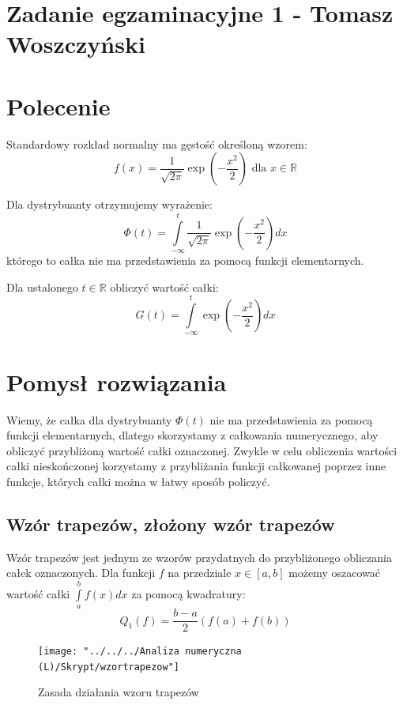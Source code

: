 \documentclass[a4paper,12pt]{article}
\begin{document}
\section*{Zadanie egzaminacyjne 1 - Tomasz Woszczyński}

\section{Polecenie}
Standardowy rozkład normalny ma gęstość określoną wzorem:
\[
    f(x) = \frac{1}{\sqrt{2\pi}} \exp \left( - \frac{x^2}{2} \right)
    \text{ dla } x \in \mathbb{R}
\]

\noindent Dla dystrybuanty otrzymujemy wyrażenie:
\[
    \Phi(t) = \int\limits_{-\infty}^{t} \frac{1}{\sqrt{2\pi}} 
                \exp \left( - \frac{x^2}{2} \right) dx
\]
którego to całka nie ma przedstawienia za pomocą funkcji elementarnych. 

\noindent Dla ustalonego $t \in \mathbb{R}$ obliczyć wartość całki:
\[
    G(t) = \int\limits_{-\infty}^{t} \exp \left( - \frac{x^2}{2} \right) dx
\]

\section{Pomysł rozwiązania}
Wiemy, że całka dla dystrybuanty $\Phi(t)$ nie ma przedstawienia za pomocą
funkcji elementarnych, dlatego skorzystamy z całkowania numerycznego, aby
obliczyć przybliżoną wartość całki oznaczonej. Zwykle w celu obliczenia
wartości całki nieskończonej korzystamy z przybliżania funkcji całkowanej
poprzez inne funkcje, których całki można w łatwy sposób policzyć. 

\subsection{Wzór trapezów, złożony wzór trapezów}
Wzór trapezów jest jednym ze wzorów przydatnych do przybliżonego obliczania
całek oznaczonych. Dla funkcji $f$ na przedziale $x \in [a,b]$ możemy
oszacować wartość całki $\int\limits_a^b f(x) dx$ za pomocą kwadratury:
\[
    Q_1 (f) = \frac{b-a}{2} \left( f(a) + f(b) \right)
\]

\begin{figure}[H]
    \texttt{[image: "../../../Analiza numeryczna (L)/Skrypt/wzortrapezow"]}
    \centering
    \caption{Zasada działania wzoru trapezów}
\end{figure}
\end{document}
